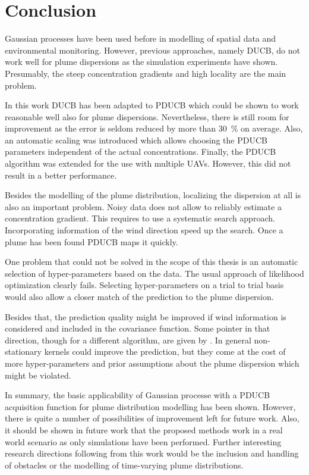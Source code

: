 \chapter{Conclusion}
Gaussian processes have been used before in modelling of spatial data and 
environmental monitoring. However, previous approaches, namely DUCB, do not work 
well for plume dispersions as the simulation experiments have shown. Presumably, 
the steep concentration gradients and high locality are the main problem.

In this work DUCB has been adapted to PDUCB which could be shown to work 
reasonable well also for plume dispersions. Nevertheless, there is still room 
for improvement as the error is seldom reduced by more than \SI{30}{\percent} on 
average. Also, an automatic scaling was introduced which allows choosing the 
PDUCB parameters independent of the actual concentrations. Finally, the PDUCB 
algorithm was extended for the use with multiple UAVs. However, this did not 
result in a better performance.

Besides the modelling of the plume distribution, localizing the dispersion at 
all is also an important problem. Noisy data does not allow to reliably estimate 
a concentration gradient. This requires to use a systematic search approach.  
Incorporating information of the wind direction speed up the search. Once 
a plume has been found PDUCB maps it quickly.

One problem that could not be solved in the scope of this thesis is an automatic 
selection of hyper-parameters based on the data. The usual approach of 
likelihood optimization clearly fails. Selecting hyper-parameters on a trial to 
trial basis would also allow a closer match of the prediction to the plume 
dispersion.

Besides that, the prediction quality might be improved if wind information is 
considered and included in the covariance function. Some pointer in that 
direction, though for a different algorithm, are given by 
\textcite{Reggente:2009ti}. In general non-stationary kernels could improve the 
prediction, but they come at the cost of more hyper-parameters and prior 
assumptions about the plume dispersion which might be violated.

In summary, the basic applicability of Gaussian processe with a PDUCB 
acquisition function for plume distribution modelling has been shown. However, 
there is quite a number of possibilities of improvement left for future work.  
Also, it should be shown in future work that the proposed methods work in a real 
world scenario as only simulations have been performed. Further interesting 
research directions following from this work would be the inclusion and handling 
of obstacles or the modelling of time-varying plume distributions.

